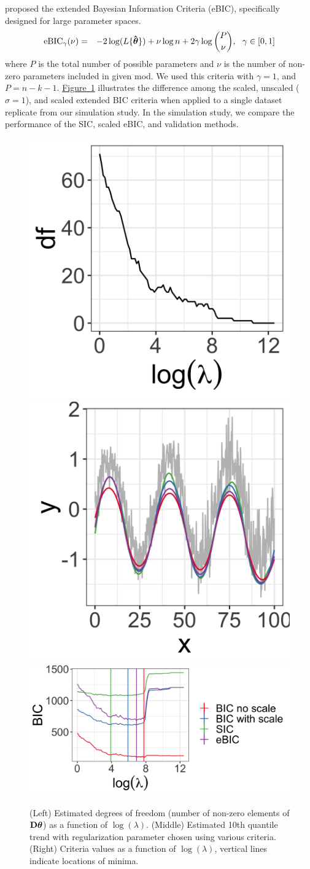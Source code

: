 \documentclass[12pt]{article}
\newcommand{\Fig}[1]{\hyperref[fig:#1]{Figure~\ref*{fig:#1}}} %
\newcommand{\Fig}[1]{{Figure~\ref{fig:#1}}} %
\newcommand{\V}[1]{{\bm{\mathbf{\MakeLowercase{#1}}}}} %
\newcommand{\Vhat}[1]{{\bm{\hat \mathbf{\MakeLowercase{#1}}}}} %
\newcommand{\M}[1]{{\bm{\mathbf{\MakeUppercase{#1}}}}} %
\begin{document}
	\cite{chen2008} proposed the extended Bayesian Information Criteria (eBIC), specifically designed for large parameter spaces. 
	\begin{eqnarray*}
	\label{eq:eBIC}
	\mbox{eBIC}_{\gamma}(\nu) & = & -2\log(L\{\Vhat{\theta}\}) + \nu\log n  + 2\gamma\log{P \choose \nu},~~\gamma \in [0,1]
	\end{eqnarray*}
	where $P$ is the total number of possible parameters and $\nu$ is the number of non-zero parameters included in given mod. We used this criteria with $\gamma = 1$, and $P=n-k-1$. \Fig{BIC} illustrates the difference among the scaled, unscaled ($\sigma = 1$), and scaled extended BIC criteria
	when applied to a single dataset replicate from our simulation study. In the simulation study, we compare the performance of the SIC, scaled eBIC, and validation methods. 
	
	\begin{figure}[h!]
		\includegraphics[width = 0.25\linewidth]{Figures/df_by_lambda.png}
		\includegraphics[width = 0.25\linewidth]{Figures/BIC_data.png}
		\includegraphics[width = 0.5\linewidth]{Figures/BIC_by_lambda.png} 
		\caption{(Left) Estimated degrees of freedom (number of non-zero elements of $\M{D}\V{\theta}$) as a function of $\log(\lambda)$. (Middle) Estimated 10th quantile trend with regularization parameter chosen using various criteria. (Right) Criteria values as a function of $\log(\lambda)$, vertical lines indicate locations of minima.} 
		\label{fig:BIC}
	\end{figure}
\end{document}
